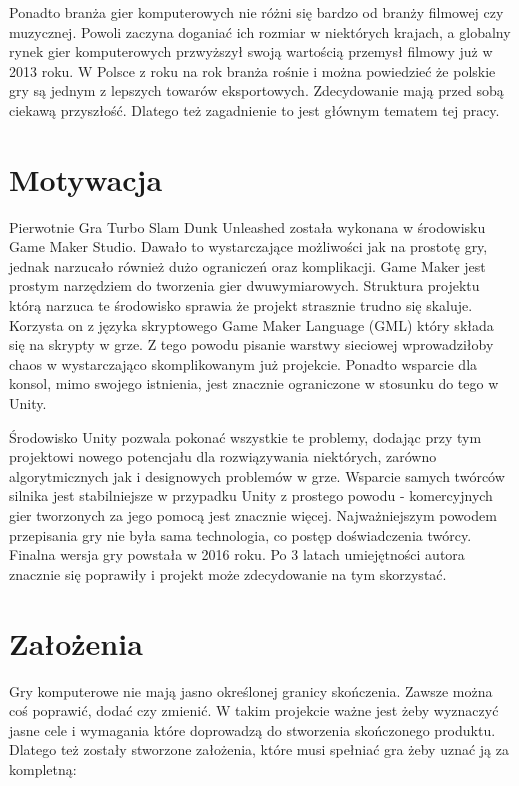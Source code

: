 \documentclass[a4paper,12pt,twoside,openany]{report}
\begin{document}
Ponadto branża gier komputerowych nie różni się bardzo od branży filmowej czy muzycznej. Powoli zaczyna doganiać ich rozmiar w niektórych krajach, a globalny rynek gier komputerowych przwyższył swoją wartością przemysł filmowy już w 2013 roku. W Polsce z roku na rok branża rośnie i można powiedzieć że polskie gry są jednym z lepszych towarów eksportowych\cite{canalplus_gry}. Zdecydowanie mają przed sobą ciekawą przyszłość. Dlatego też zagadnienie to jest głównym tematem tej pracy. 

\section{Motywacja}
Pierwotnie Gra Turbo Slam Dunk Unleashed została wykonana w środowisku Game Maker Studio. Dawało to wystarczające możliwości jak na prostotę gry, jednak narzucało również dużo ograniczeń oraz komplikacji. Game Maker jest prostym narzędziem do tworzenia gier dwuwymiarowych. Struktura projektu którą narzuca te środowisko sprawia że projekt strasznie trudno się skaluje. Korzysta on z języka skryptowego Game Maker Language (GML) który składa się na skrypty w grze. Z tego powodu pisanie warstwy sieciowej wprowadziłoby chaos w wystarczająco skomplikowanym już projekcie. Ponadto wsparcie dla konsol, mimo swojego istnienia, jest znacznie ograniczone w stosunku do tego w Unity.

Środowisko Unity pozwala pokonać wszystkie te problemy, dodając przy tym projektowi nowego potencjału dla rozwiązywania niektórych, zarówno algorytmicznych jak i designowych problemów w grze. Wsparcie samych twórców silnika jest stabilniejsze w przypadku Unity z prostego powodu - komercyjnych gier tworzonych za jego pomocą jest znacznie więcej. Najważniejszym powodem przepisania gry nie była sama technologia, co postęp doświadczenia twórcy. Finalna wersja gry powstała w 2016 roku. Po 3 latach umiejętności autora znacznie się poprawiły i projekt może zdecydowanie na tym skorzystać. 

\section{Założenia}
Gry komputerowe nie mają jasno określonej granicy skończenia. Zawsze można coś poprawić, dodać czy zmienić. W takim projekcie ważne jest żeby wyznaczyć jasne cele i wymagania które doprowadzą do stworzenia skończonego produktu. Dlatego też zostały stworzone założenia, które musi spełniać gra żeby uznać ją za kompletną:
\end{document}
